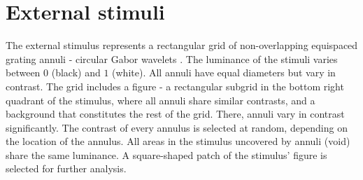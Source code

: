 \section{External stimuli}
\label{sec:external-stimuli}

The external stimulus represents a rectangular grid of non-overlapping equispaced grating annuli - circular Gabor wavelets \cite{MaryamPLACEHOLDER}. The luminance of the stimuli varies between $0$ (black) and $1$ (white). All annuli have equal diameters but vary in contrast. The grid includes a figure - a rectangular subgrid in the bottom right quadrant of the stimulus, where all annuli share similar contrasts, and a background that constitutes the rest of the grid. There, annuli vary in contrast significantly. The contrast of every annulus is selected at random, depending on the location of the annulus. All areas in the stimulus uncovered by annuli (void) share the same luminance. A square-shaped patch of the stimulus' figure is selected for further analysis.




